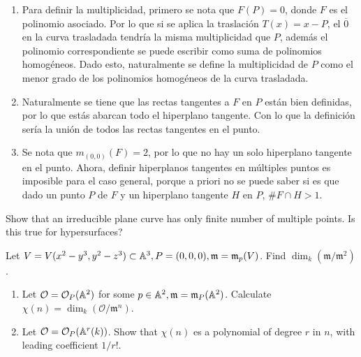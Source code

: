 \begin{sol}{3.9}
    \begin{enumerate}
        \item Para definir la multiplicidad, primero se nota que \(F(P)=0\), donde \(F\) es el polinomio asociado. Por lo que si se aplica la traslación \(T(x)=x-P\), el \(\overline{0}\) en la curva trasladada tendría la misma multiplicidad que \(P\), además el polinomio correspondiente se puede escribir como suma de polinomios homogéneos. Dado esto, naturalmente se define la multiplicidad de \(P\) como el menor grado de los polinomios homogéneos de la curva trasladada.
        \item Naturalmente se tiene que las rectas tangentes a \(F\) en \(P\) están bien definidas, por lo que estás abarcan todo el hiperplano tangente. Con lo que la definición sería la unión de todos las rectas tangentes en el punto.
        \item Se nota que \(m_{(0,0)}(F)=2\), por lo que no hay un solo hiperplano tangente en el punto. Ahora, definir hiperplanos tangentes en múltiples puntos es imposible para el caso general, porque a priori no se puede saber si es que dado un punto \(P\) de \(F\) y un hiperplano tangente \(H\) en \(P\), \(\#F\cap H>1\).
    \end{enumerate}
\end{sol}

\begin{prob}{3.10}
    Show that an irreducible plane curve has only finite number of multiple points. Is this true for hypersurfaces?
\end{prob}

\begin{sol}{3.10}

\end{sol}

\begin{prob}{3.14}
    Let \(V=V(x^2-y^3,y^2-z^3)\subset\mathbb{A}^3,P=(0,0,0),\mathfrak{m}=\mathfrak{m}_p(V)\). Find \(\dim_k(\mathfrak{m}/\mathfrak{m}^2)\).
\end{prob}

\begin{sol}{3.14}

\end{sol}

\begin{prob}{3.15}
    \begin{enumerate}
        \item Let \(\mathcal{O}=\mathcal{O}_P(\mathbb{A}^2)\) for some \(p\in\mathbb{A}^2,\mathfrak{m}=\mathfrak{m}_P(\mathbb{A}^2)\). Calculate \(\chi(n)=\dim_k(\mathcal{O}/\mathfrak{m}^n)\).
        \item Let \(\mathcal{O}=\mathcal{O}_P(\mathbb{A}^r(k))\). Show that \(\chi(n)\) es a polynomial of degree \(r\) in \(n\), with leading coefficient \(1/r!\).
    \end{enumerate}
\end{prob}

